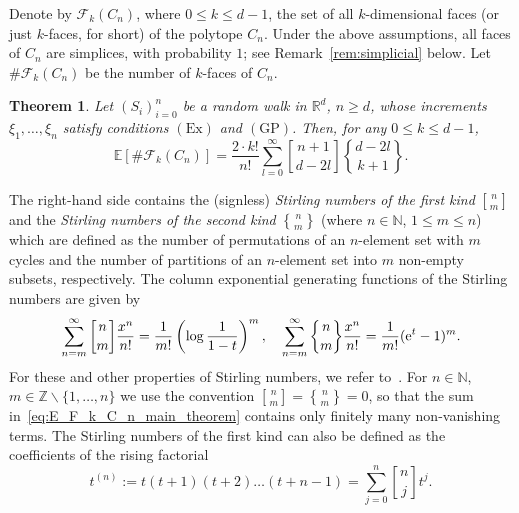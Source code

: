 \documentclass[12pt, reqno]{amsart}
\theoremstyle{plain}
\newtheorem{theorem}{Theorem}[section]
\theoremstyle{definition}
\theoremstyle{remark}
\begin{document}
Denote by $\mathcal F_k(C_n)$, where $0\leq k\leq d-1$, the set of all $k$-dimensional faces (or just $k$-faces, for short) of the polytope $C_n$. Under the above assumptions, all faces of $C_n$ are simplices, with probability $1$; see Remark~\ref{rem:simplicial} below.  Let $\# \mathcal F_k(C_n)$ be the number of $k$-faces of $C_n$.
\begin{theorem}\label{theo:expected_walk}
Let $(S_i)_{i=0}^n$ be a random walk in ${\mathbb{R}}^d$, $n\geq d$,  whose increments $\xi_1,\ldots,\xi_n$ satisfy conditions $(\text{Ex})$ and $(\text{GP})$.
Then, for any $0\leq k\leq d-1$, 
\begin{equation}\label{eq:E_F_k_C_n_main_theorem}
{\mathbb E} [\#\mathcal{F}_k(C_n)] = \frac{2\cdot k!}{n!} \sum_{l=0}^{\infty}{\genfrac{[}{]}{0pt}{}{{n+1}}{{d-2l}}}  {\genfrac{\{}{\}}{0pt}{}{{d-2l}}{{k+1}}}.
\end{equation}
\end{theorem}
 The right-hand side  contains the (signless) \emph{Stirling numbers of the first kind} ${\genfrac{[}{]}{0pt}{}{{n}}{{m}}}$ and the \emph{Stirling numbers of the second kind} ${\genfrac{\{}{\}}{0pt}{}{{n}}{{m}}}$ (where $n\in{\mathbb{N}}$, $1\leq m \leq n$) which are defined as the number of permutations of an $n$-element set with $m$ cycles and the number of partitions of an $n$-element set into $m$ non-empty subsets, respectively. The column exponential generating functions of the Stirling numbers are given by
\begin{equation}\label{eq:stirling_def}
\sum_{n=m}^{\infty} {\genfrac{[}{]}{0pt}{}{{n}}{{m}}}\frac{x^n}{n!} = \frac 1 {m!} \left(\log \frac 1 {1-t}\right)^m,
\quad
\sum_{n=m}^{\infty} {\genfrac{\{}{\}}{0pt}{}{{n}}{{m}}}\frac{x^n}{n!} = \frac 1 {m!} ({{\rm e}}^{t}-1)^m.
\end{equation}
For these and other properties of Stirling numbers, we refer to~\cite[Chapters~6,7]{graham_knuth_patashnik_book}. For $n\in{\mathbb{N}}$,  $m\in {\mathbb{Z}}\backslash \{1,\ldots,n\}$ we use the convention ${\genfrac{[}{]}{0pt}{}{{n}}{{m}}} = {\genfrac{\{}{\}}{0pt}{}{{n}}{{m}}}=0$, so that the sum in~\eqref{eq:E_F_k_C_n_main_theorem} contains only finitely many non-vanishing terms.
The Stirling numbers of the first kind can also be defined as the coefficients of the rising factorial
\begin{equation}\label{eq:rising_factorial}
t^{(n)} := t(t+1)(t+2)\ldots (t+n-1) = \sum_{j=0}^n {\genfrac{[}{]}{0pt}{}{{n}}{{j}}} t^j.
\end{equation}
\end{document}
